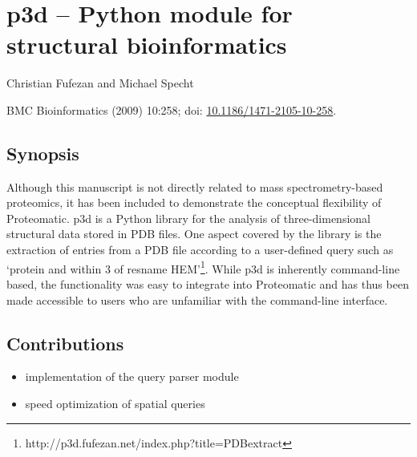 \cleardoublepage
\section{p3d -- Python module for structural bioinformatics}

Christian Fufezan and Michael Specht

BMC Bioinformatics (2009) 10:258; doi: \href{http://dx.doi.org/10.1186/1471-2105-10-258}{10.1186/1471-2105-10-258}.

\subsection*{Synopsis}

Although this manuscript is not directly related to mass spectrometry-based
proteomics, it has been included to demonstrate the conceptual flexibility of 
Proteomatic.
p3d is a Python library for the analysis of three-dimensional structural
data stored in PDB files.
One aspect covered by the library is the extraction of entries from a PDB file
according to a user-defined query such as `protein and within 3 of resname 
HEM'\footnote{http://p3d.fufezan.net/index.php?title=PDBextract}.
While p3d is inherently command-line based, the functionality was easy to
integrate into Proteomatic and has thus been made accessible to users 
who are unfamiliar with the command-line interface.

\subsection*{Contributions}

\begin{itemize}
\item implementation of the query parser module
\item speed optimization of spatial queries
\end{itemize}

{}
